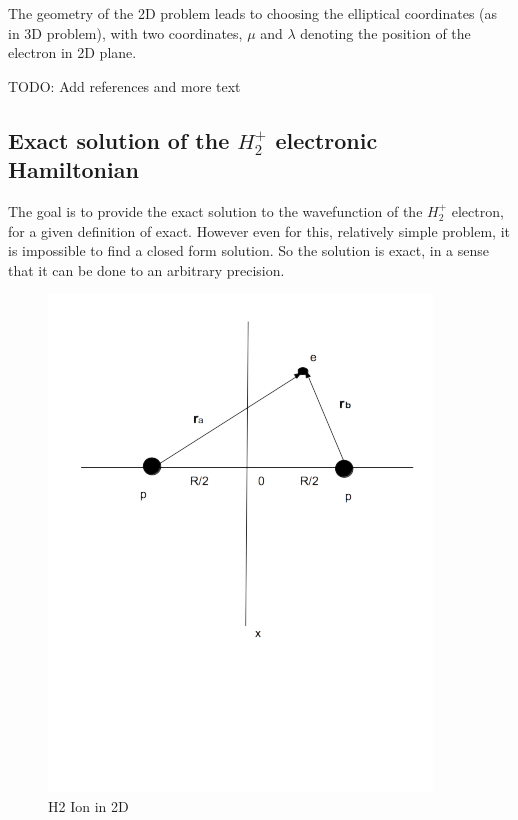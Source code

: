 The geometry of the 2D problem leads to choosing the elliptical coordinates (as in 3D problem), with two coordinates, $ \mu $ and $ \lambda $ denoting the position of the electron in 2D plane. \cite{Arfken}

TODO: Add references and more text

\subsection{Exact solution of the  $ H_2^{+} $ electronic Hamiltonian}

The goal is to provide the exact solution to the wavefunction of the $ H_2^{+} $ electron, for a given definition of exact. However even for this, relatively simple problem, it is impossible to find a closed form solution. So the solution is exact, in a sense that it can be done to an arbitrary precision.

\begin{figure}
  \includegraphics{H2Ion2D.png}
  \caption{H2 Ion in 2D} \label{h2ion2d}
\end{figure}

